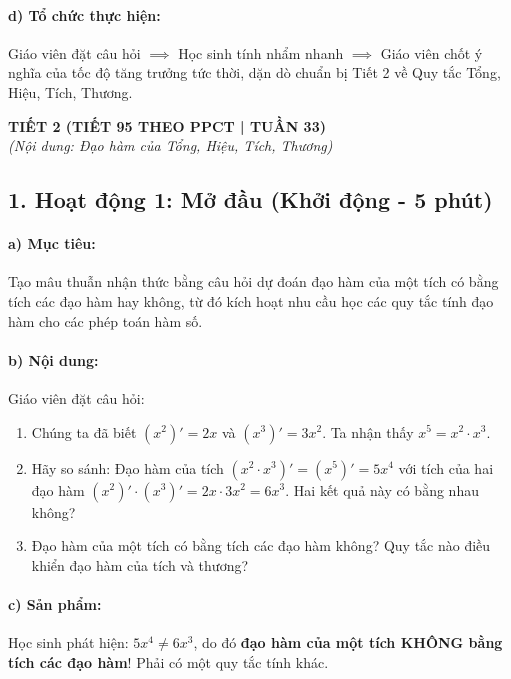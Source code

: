 \documentclass[12pt, a4paper]{article}
\begin{document}
\paragraph{d) Tổ chức thực hiện:} Giáo viên đặt câu hỏi $\implies$ Học sinh tính nhẩm nhanh $\implies$ Giáo viên chốt ý nghĩa của tốc độ tăng trưởng tức thời, dặn dò chuẩn bị Tiết 2 về Quy tắc Tổng, Hiệu, Tích, Thương.

\newpage

\begin{center}
    \textbf{\large TIẾT 2 (TIẾT 95 THEO PPCT | TUẦN 33)}\\[4pt]
    \textit{(Nội dung: Đạo hàm của Tổng, Hiệu, Tích, Thương)}
\end{center}

\subsection*{1. Hoạt động 1: Mở đầu (Khởi động - 5 phút)}

\paragraph{a) Mục tiêu:} Tạo mâu thuẫn nhận thức bằng câu hỏi dự đoán đạo hàm của một tích có bằng tích các đạo hàm hay không, từ đó kích hoạt nhu cầu học các quy tắc tính đạo hàm cho các phép toán hàm số.

\paragraph{b) Nội dung:} Giáo viên đặt câu hỏi:
\begin{enumerate}[leftmargin=0.6cm]
    \item Chúng ta đã biết $(x^2)' = 2x$ và $(x^3)' = 3x^2$. Ta nhận thấy $x^5 = x^2 \cdot x^3$.
    \item Hãy so sánh: Đạo hàm của tích $(x^2 \cdot x^3)' = (x^5)' = 5x^4$ với tích của hai đạo hàm $(x^2)' \cdot (x^3)' = 2x \cdot 3x^2 = 6x^3$. Hai kết quả này có bằng nhau không?
    \item Đạo hàm của một tích có bằng tích các đạo hàm không? Quy tắc nào điều khiển đạo hàm của tích và thương?
\end{enumerate}

\paragraph{c) Sản phẩm:} Học sinh phát hiện: $5x^4 \neq 6x^3$, do đó \textbf{đạo hàm của một tích KHÔNG bằng tích các đạo hàm}! Phải có một quy tắc tính khác.
\end{document}
